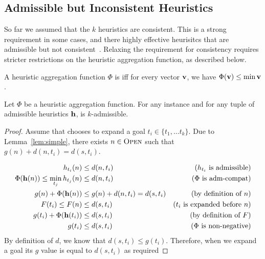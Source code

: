 \subsection{Admissible but Inconsistent Heuristics}
So far we assumed that the $k$ heuristics are consistent. This is a strong requirement in some cases, and there highly effective heurisitcs that are admissible but not consistent~\cite{felner}. Relaxing the requirement for consistency requires stricter restrictions on the heuristic aggregation function, as described below. 



\begin{definition}
	A heuristic aggregation function $\Phi$ is \emph{\axiomadm} iff for every vector $\mathbf{v}$, we have $\Phi(\mathbf{v}) \leq \min \mathbf{v}$.
\end{definition}



\begin{theorem}
	\label{thm:admissible}
	Let $\Phi$ be a \axiomadm heuristic aggregation function.
	For any \kgs instance and for any tuple of admissible heuristics $\mathbf{h}$, \kastarphi is $k$-admissible.
\end{theorem}
\begin{proof}
	Assume that \kastarphi chooses to expand a goal $t_i\in\{t_1,\ldots t_k\}$.
	Due to Lemma~\ref{lem:simple}, there exists $n\in \textsc{Open}$ such that $g(n) + d(n, t_i) = d(s, t_i)$.
	
	\begin{align}
	h_{t_i}(n) & \leq d(n,t_i) & \text{($h_{t_i}$ is admissible)}\\
	\Phi(\mathbf{h}(n)) \leq \min_{t_j} h_{t_j}(n) & \leq d(n, t_i) & \text{($\Phi$ is adm-compat)}\\
	g(n) + \Phi(\mathbf{h}(n)) & \leq g(n) + d(n, t_i) = d(s, t_i) & \text{(by definition of $n$)}\\
	F(t_i) \leq F(n) & \leq d(s, t_i) & \text{($t_i$ is expanded before $n$)}\\
	g(t_i) + \Phi(\mathbf{h}(t_i)) & \leq d(s, t_i) & \text{(by definition of $F$)}\\
	g(t_i) & \leq d(s, t_i) & \text{($\Phi$ is non-negative)}
	\end{align}
By definition of $d$, we know that $d(s,t_i)\leq g(t_i)$. Therefore, when we expand a goal its $g$ value is equal to $d(s, t_i)$ as required
\end{proof}

